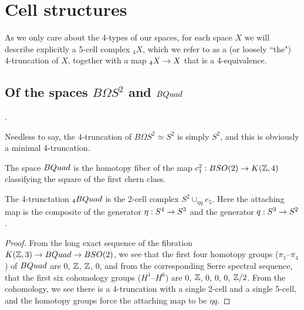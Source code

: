 \documentclass{amsart}
\begin{document}
\section{Cell structures}


As we only care about the 4-types of our spaces, for each space $X$ we will describe explicitly a 5-cell complex $_4 X$, which we refer to as a (or loosely ``the") 4-truncation of $X$, together with a map $_4 X \rightarrow X$ that is a 4-equivalence.  



\subsection{Of the spaces $B\Omega S^2$ and $BQuad$}.

Needless to say, the 4-truncation of $B\Omega S^2 \simeq S^2$ is simply $S^2$, and this is obviously a minimal 4-truncation.

\begin{definition}
The space $BQuad$ is the homotopy fiber of the map $c_1^2: BSO(2) \rightarrow K(\mathbb Z,4)$ classifying the square of the first chern class.
\end{definition}


\begin{proposition}
The 4-trunctation $_4 BQuad$ is the 2-cell complex $S^2 \cup_{\eta q} e_5$.  Here the attaching map is the composite of the generator $\eta: S^4 \rightarrow S^3$ and the generator $q: S^3 \rightarrow S^2$.
\end{proposition}

\begin{proof}
From the long exact sequence of the fibration $K(\mathbb Z,3) \rightarrow BQuad \rightarrow BSO(2)$, we see that the first four homotopy groups ($\pi_1$--$\pi_4$) of $BQuad$ are $0$, $\mathbb Z$, $\mathbb Z$, $0$, and from the corresponding Serre spectral sequence, that the first six cohomology groups ($H^1$--$H^6$) are $0$, $\mathbb Z$, $0$, $0$, $0$, $\mathbb Z/2$.  From the cohomology, we see there is a 4-truncation with a single 2-cell and a single 5-cell, and the homotopy groups force the attaching map to be $\eta q$.
\end{proof}
\end{document}
